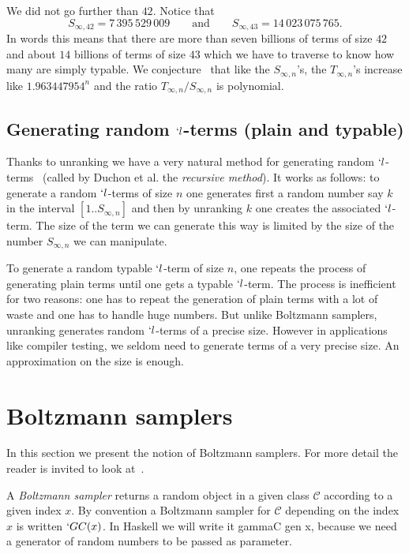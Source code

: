 \documentclass{sig-alternate}
\newcommand{\C}{\mathscr{C}}
\newcommand{\nbt}[1]{T_{\infty,#1}}
\begin{document}
We did not go further than $42$. Notice that
\begin{displaymath}
  S_{\infty,42} = 7\,395\,529\,009 \qquad \textrm{and} \qquad
  S_{\infty,43} = 14\,023\,075\,765.
\end{displaymath}
In words this means that there are more than seven billions of terms of size $42$ and about
$14$ billions of terms of size $43$ which we have to traverse to know how many are
simply typable.  We conjecture~\cite{lescanne13} that like the $S_{\infty,n}$'s, the
$\nbt{n}$'s increase like $1.963447954^n$ and the ratio $\nbt{n} / S_{\infty,n}$ is
polynomial.

\subsection{Generating random $`l$-terms (plain and typable)}
\label{sec:gen}

Thanks to unranking we have a very natural method for generating random
$`l$-terms~\cite{nijenhuis78:_combin} (called by Duchon et
al. \cite{DBLP:journals/cpc/DuchonFLS04} the \emph{recursive method}).  It works as
follows: to generate a random $`l$-terms of size $n$ one generates first a random
number say $k$ in the interval $[1..S_{\infty,n}]$ and then by unranking $k$ one
creates the associated $`l$-term. The size of the term we can generate this way is
limited by the size of the number $S_{\infty,n}$ we can manipulate. 

To generate a random typable $`l$-term of size $n$, one repeats the process of
generating plain terms until one gets a typable $`l$-term.  The process is
inefficient for two reasons: one has to repeat the generation of plain terms with a
lot of waste and one has to handle huge numbers.  But unlike Boltzmann samplers,
unranking generates random $`l$-terms of a precise size. However in applications like
compiler testing, we seldom need to generate terms of a very precise size. An
approximation on the size is enough.

\section{Boltzmann samplers}
\label{sec:Boltzmann}

In this section we present the notion of Boltzmann samplers. For more detail the
reader is invited to look at~\cite{DBLP:journals/cpc/DuchonFLS04}.

A \emph{Boltzmann sampler} returns a random object in a given class $\C$ according to
a given index $x$.  By convention a Boltzmann sampler for $\C$ depending on the index
$x$ is written $`G C(x)$.  In \textsf{Haskell} we will write it \<gammaC gen x\>, because
we need a generator of random numbers to be passed as parameter.
\end{document}
